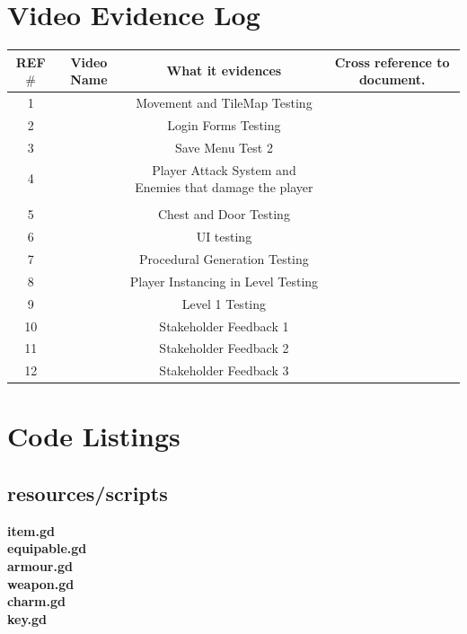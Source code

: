 \documentclass{article}
\newcommand{\mr}[3]{\multirow{#1}{#2}{#3}}
\begin{document}
\section{Video Evidence Log}
\begin{tabular}{|c|c|c|c|}
        \hline
        REF$\#$&Video Name&What it evidences&Cross reference to document.\\
        \hline
        1&&Movement and TileMap Testing&\\
        \hline
        2&&Login Forms Testing&\\
        \hline
        3&&Save Menu Test 2&\\
        \hline
        4&&\mr{1}{5cm}{Player Attack System and Enemies that damage the player}&\\
        &&&\\
        \hline
        5&&Chest and Door Testing&\\
        \hline
        6&&UI testing&\\
        \hline
        7&&Procedural Generation Testing&\\
        \hline
        8&&Player Instancing in Level Testing&\\
        \hline
        9&&Level 1 Testing&\\
        \hline
        10&&Stakeholder Feedback 1&\\
        \hline
        11&&Stakeholder Feedback 2&\\
        \hline
        12&&Stakeholder Feedback 3&\\
        \hline
\end{tabular}
\newpage
{}
\section{Code Listings}
\subsection{resources/scripts}
\textbf{item.gd}\\

\textbf{equipable.gd}\\

\textbf{armour.gd}\\

\textbf{weapon.gd}\\

\textbf{charm.gd}\\

\newpage
\textbf{key.gd}\\

\end{document}
